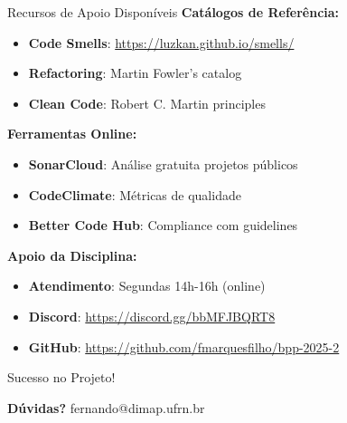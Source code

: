 \documentclass[10pt]{beamer}
\begin{document}
\begin{frame}{Recursos de Apoio Disponíveis}
\textbf{Catálogos de Referência:}
\begin{itemize}
    \item \textbf{Code Smells}: \url{https://luzkan.github.io/smells/}
    \item \textbf{Refactoring}: Martin Fowler's catalog
    \item \textbf{Clean Code}: Robert C. Martin principles
\end{itemize}

\vspace{0.3cm}
\textbf{Ferramentas Online:}
\begin{itemize}
    \item \textbf{SonarCloud}: Análise gratuita projetos públicos
    \item \textbf{CodeClimate}: Métricas de qualidade
    \item \textbf{Better Code Hub}: Compliance com guidelines
\end{itemize}

\vspace{0.3cm}
\textbf{Apoio da Disciplina:}
\begin{itemize}
    \item \textbf{Atendimento}: Segundas 14h-16h (online)
    \item \textbf{Discord}: \url{https://discord.gg/bbMFJBQRT8}
    \item \textbf{GitHub}: \url{https://github.com/fmarquesfilho/bpp-2025-2}
\end{itemize}
\end{frame}

\begin{frame}{Sucesso no Projeto!}
\centering

\vspace{0.5cm}
\textbf{Dúvidas?} fernando@dimap.ufrn.br
\end{frame}
\end{document}

